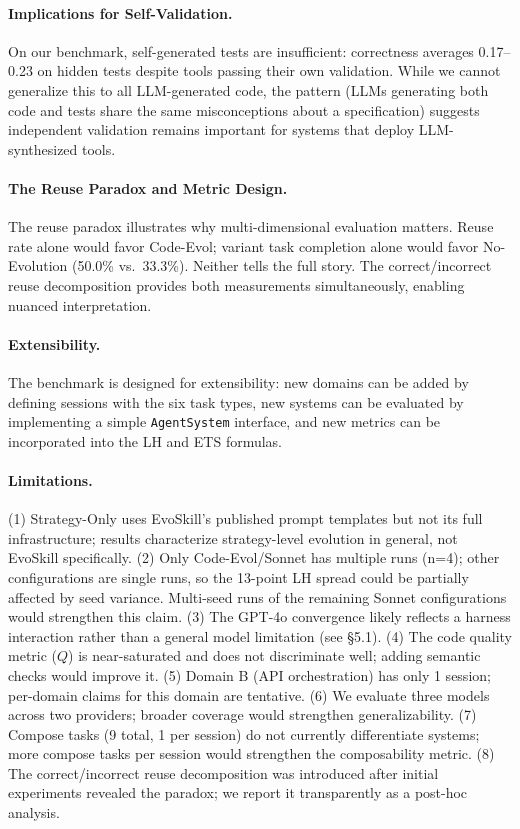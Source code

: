 \documentclass[sigplan,review,anonymous]{acmart}
\begin{document}
\paragraph{Implications for Self-Validation.} On our benchmark, self-generated tests are insufficient: correctness averages 0.17--0.23 on hidden tests despite tools passing their own validation. While we cannot generalize this to all LLM-generated code, the pattern (LLMs generating both code and tests share the same misconceptions about a specification) suggests independent validation remains important for systems that deploy LLM-synthesized tools.

\paragraph{The Reuse Paradox and Metric Design.} The reuse paradox illustrates why multi-dimensional evaluation matters. Reuse rate alone would favor Code-Evol; variant task completion alone would favor No-Evolution (50.0\% vs.\ 33.3\%). Neither tells the full story. The correct/incorrect reuse decomposition provides both measurements simultaneously, enabling nuanced interpretation.

\paragraph{Extensibility.} The benchmark is designed for extensibility: new domains can be added by defining sessions with the six task types, new systems can be evaluated by implementing a simple \texttt{AgentSystem} interface, and new metrics can be incorporated into the LH and ETS formulas.

\paragraph{Limitations.} (1) Strategy-Only uses EvoSkill's published prompt templates but not its full infrastructure; results characterize strategy-level evolution in general, not EvoSkill specifically. (2) Only Code-Evol/Sonnet has multiple runs (n=4); other configurations are single runs, so the 13-point LH spread could be partially affected by seed variance. Multi-seed runs of the remaining Sonnet configurations would strengthen this claim. (3) The GPT-4o convergence likely reflects a harness interaction rather than a general model limitation (see \S5.1). (4) The code quality metric ($Q$) is near-saturated and does not discriminate well; adding semantic checks would improve it. (5) Domain B (API orchestration) has only 1 session; per-domain claims for this domain are tentative. (6) We evaluate three models across two providers; broader coverage would strengthen generalizability. (7) Compose tasks (9 total, 1 per session) do not currently differentiate systems; more compose tasks per session would strengthen the composability metric. (8) The correct/incorrect reuse decomposition was introduced after initial experiments revealed the paradox; we report it transparently as a post-hoc analysis.
\end{document}
